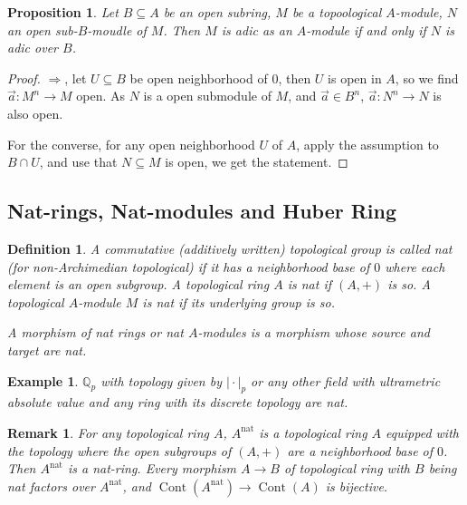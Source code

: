 \documentclass[8pt]{article}
\numberwithin{equation}{section}
\newtheorem{proposition}{Proposition}[subsection]
\newtheorem{definition}{Definition}[subsection]
\newtheorem{remark}{Remark}[subsection]
\newtheorem{example}{Example}[subsection]
\DeclareMathOperator{\Cont}{Cont}
\newcommand{\Q}[0]{\mathbb{Q}}
\newcommand{\ab}[1]{\vert #1 \vert}
\newcommand{\nat}[0]{\mathrm{nat}}
\begin{document}
\begin{proposition}
    \label{fact_16_22}
    Let $B\subseteq A$ be an open subring, $M$ be a topoological $A$-module, $N$ an open sub-$B$-moudle of $M$. Then $M$ is adic as an $A$-module if and only if $N$ is adic over $B$. 
\end{proposition}
\begin{proof}
    $\Rightarrow$, let $U\subseteq B$ be open neighborhood of $0$, then $U$ is open in $A$, so we find $\vec{a}:M^n\to M$ open. As $N$ is a open submodule of $M$, and $\vec{a}\in B^n$, $\vec{a}:N^n\to N$ is also open.
    \par For the converse, for any open neighborhood $U$ of $A$, apply the assumption to $B\cap U$, and use that $N\subseteq M$ is open, we get the statement.
\end{proof}
\subsection{Nat-rings, Nat-modules and Huber Ring}

\begin{definition}
    A commutative (additively written) topological group is called nat (for non-Archimedian topological) if it has a neighborhood base of $0$ where each element is an open subgroup. %
    A topological ring $A$ is nat if $(A,+)$ is so. A topological $A$-module $M$ is nat if its underlying group is so.
    \par A morphism of nat rings or nat $A$-modules is a morphism whose source and target are nat.
\end{definition}

\begin{example}
    $\Q_p$ with topology given by $\ab{\cdot}_p$ or any other field with ultrametric absolute value and any ring with its discrete topology are nat. 
\end{example}
\begin{remark}
    For any topological ring $A$, $A^{\mathrm{nat}}$ is a topological ring $A$ equipped with the topology where the open subgroups of $(A,+)$ are a neighborhood base of $0$. Then $A^{\nat}$ is a nat-ring. Every morphism $A\to B$ of topological ring with $B$ being nat factors over $A^{\nat}$, and $\Cont(A^\nat)\to \Cont(A)$ is bijective.
\end{remark}
\end{document}

